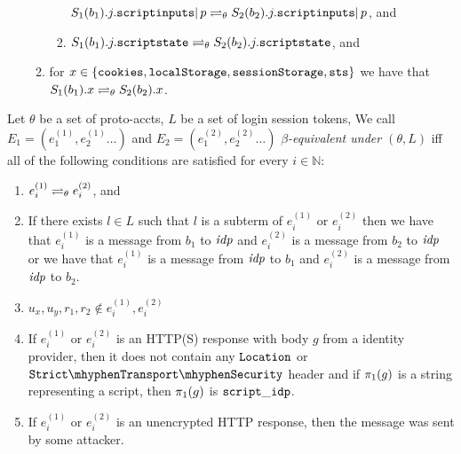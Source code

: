 \begin{definition}
\begin{enumerate}
\begin{enumerate}
\begin{enumerate}
          $S_1(b_1).j.\mathtt{scriptinputs} |\, p \rightleftharpoons_{\theta}
          S_2(b_2).j.\mathtt{scriptinputs} |\, p$, and
        \item\label{eqs:rp:b:w:script}
          $S_1(b_1).j.\mathtt{scriptstate} \rightleftharpoons_{\theta}
          S_2(b_2).j.\mathtt{scriptstate}$, and 
        \end{enumerate}
      \item\label{eqs:rp:b:misc} for
        $x \in \{\mathtt{cookies},\mathtt{localStorage},\mathtt{sessionStorage},\mathtt{sts}\}$
        we have that $S_1(b_1).x \rightleftharpoons_{\theta} S_2(b_2).x$.
      \end{enumerate}
    \end{enumerate}
  \end{definition}
  
  \begin{definition}\label{def:rp:Events}
    Let $\theta$ be a set of proto-accts, 
    $L$ be a set of login session tokens, 
    We call $E_1 = (e_1^{(1)}, e_2^{(1)}\dots)$ and
    $E_2= (e_1^{(2)}, e_2^{(2)} \dots)$ 
    \emph{$\beta$-equivalent under $(\theta, L)$} 
    iff all of the following conditions are satisfied for every 
    $i \in \mathbb{N}$:
  
    \begin{enumerate}
      \item\label{eqe:rp:distinction} 
        $e_i^{(1)} \rightleftharpoons_{\theta} e_i^{(2)}$, and
      \item\label{eqe:rp:pre:l} If there exists $l \in L$ such that $l$ is a
        subterm of $e_i^{(1)}$ or $e_i^{(2)}$ then we have that
        $e_i^{(1)}$ is a message from $b_1$ to $\mathit{idp}$ and $e_i^{(2)}$ is a
        message from $b_2$ to $\mathit{idp}$ or we have that $e_i^{(1)}$ is a
        message from $\mathit{idp}$ to $b_1$ and $e_i^{(2)}$ is a message from
        $\mathit{idp}$ to $b_2$.
      \item\label{eqe:rp:pre:t} $u_x, u_y, r_1, r_2 \not\in e_i^{(1)}, e_i^{(2)}$
      \item\label{eqe:pre:idp-scripts} If $e_i^{(1)}$ or $e_i^{(2)}$ is an
        HTTP(S) response with body $g$ from a identity provider, then it does
        not contain any $\mathtt{Location}$ or $\cSTS$ header
        and if $\pi_{1}({g})$ is a string representing a script, then
        $\pi_{1}({g})$ is $\mathtt{script\_idp}$.
      \item\label{eqe:rp:pre:unencrypted-http} 
        If $e_i^{(1)}$ or $e_i^{(2)}$ is an unencrypted HTTP 
        response, then the message was sent by some attacker.
    \end{enumerate}
  \end{definition}
  

